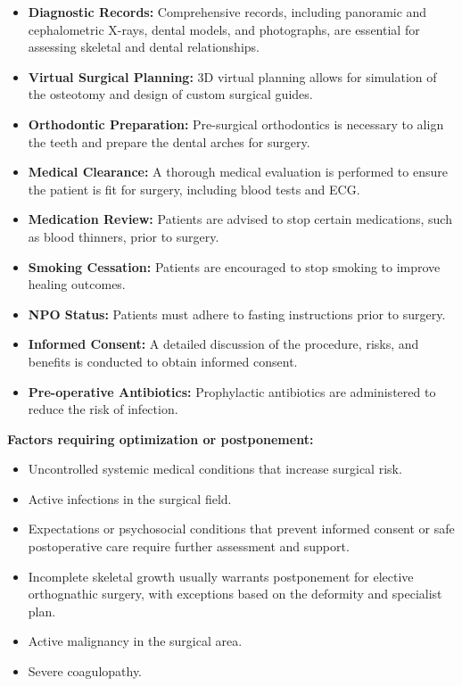 \begin{itemize}
  \item \textbf{Diagnostic Records:} Comprehensive records, including panoramic and cephalometric X-rays, dental models, and photographs, are essential for assessing skeletal and dental relationships.
  
  \item \textbf{Virtual Surgical Planning:} 3D virtual planning allows for simulation of the osteotomy and design of custom surgical guides.
  
  \item \textbf{Orthodontic Preparation:} Pre-surgical orthodontics is necessary to align the teeth and prepare the dental arches for surgery.
  
  \item \textbf{Medical Clearance:} A thorough medical evaluation is performed to ensure the patient is fit for surgery, including blood tests and ECG.
  
  \item \textbf{Medication Review:} Patients are advised to stop certain medications, such as blood thinners, prior to surgery.
  
  \item \textbf{Smoking Cessation:} Patients are encouraged to stop smoking to improve healing outcomes.
  
  \item \textbf{NPO Status:} Patients must adhere to fasting instructions prior to surgery.
  
  \item \textbf{Informed Consent:} A detailed discussion of the procedure, risks, and benefits is conducted to obtain informed consent.
  
  \item \textbf{Pre-operative Antibiotics:} Prophylactic antibiotics are administered to reduce the risk of infection.
\end{itemize}

\textbf{Factors requiring optimization or postponement:}
\begin{itemize}
  \item Uncontrolled systemic medical conditions that increase surgical risk.
  \item Active infections in the surgical field.
  \item Expectations or psychosocial conditions that prevent informed consent or safe postoperative care require further assessment and support.
  \item Incomplete skeletal growth usually warrants postponement for elective orthognathic surgery, with exceptions based on the deformity and specialist plan.
  \item Active malignancy in the surgical area.
  \item Severe coagulopathy.
\end{itemize}

